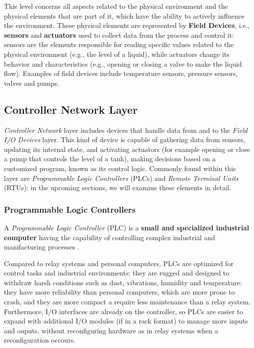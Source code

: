 This level concerns all aspects related to the physical environment and the physical elements that are part of it, which have the ability to actively influence the environment.\newline 
These physical elements are represented by \textbf{Field Devices}, i.e., \textbf{sensors} and \textbf{actuators} used to collect data from the process and control it: sensors are the elements responsible for reading specific values related to the physical environment (e.g., the level of a liquid), while actuators change its behavior and characteristics (e.g., opening or closing a valve to make the liquid flow).\newline
Examples of field devices include temperature sensors, pressure sensors, valves and pumps.

\subsection{Controller Network Layer}
\label{subsec:2_ot_controller_network}
\textit{Controller Network} layer includes devices that handle data from and
to the \textit{Field I/O Devices} layer. This kind of device is capable of gathering data from sensors, updating its internal state, and activating actuators (for example opening or close a pump that controls the level of a tank), making decisions based on a customized program, known as its control logic.\newline
Commonly found within this layer are \textit{Programmable Logic Controllers} (PLCs) and \textit{Remote Terminal Units} (RTUs): in the upcoming sections, we will examine these elements in detail.

\subsubsection{Programmable Logic Controllers}
\label{subsubsec:2_plc}
A \textit{Programmable Logic Controller} (PLC) is a \textbf{small and specialized industrial computer} having the capability of controlling complex industrial and manifacturing processes \cite{plc_definition}.

\bigskip
Compared to relay systems and personal computers, PLCs are optimized for control tasks and industrial environments: they are rugged and designed to withdraw harsh conditions such as dust, vibrations, humidity and temperature: they have more reliability than personal computers, which are more prone to crash, and they are more compact a require less maintenance than a relay system.\newline
Furthermore, I/O interfaces are already on the controller, so PLCs are easier to expand with additional I/O modules (if in a rack format) to manage more inputs and ouputs, without reconfiguring hardware as in relay systems when a reconfiguration occours. 

